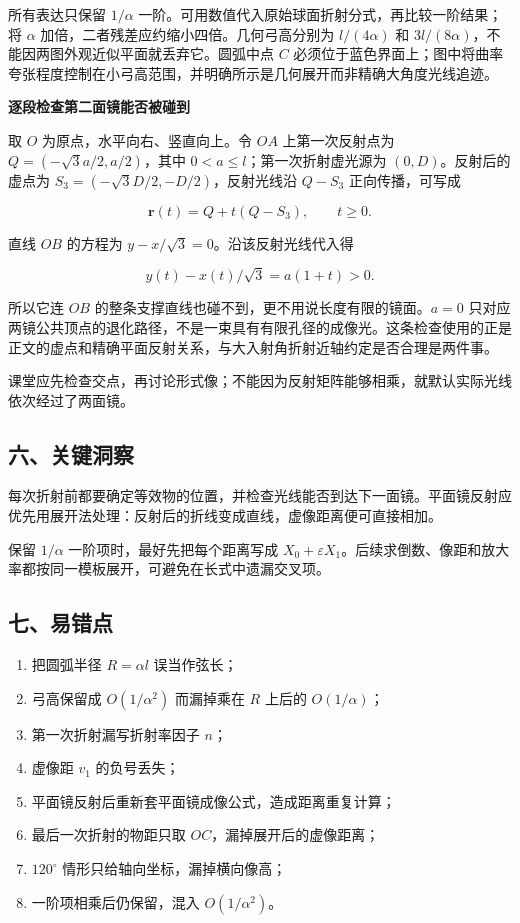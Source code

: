 \documentclass[12pt,a4paper,UTF8]{ctexart}
\newcommand{\tightlist}{\setlength{\itemsep}{0pt}\setlength{\parskip}{0pt}}
\begin{document}
所有表达只保留 \(1/\alpha\)
一阶。可用数值代入原始球面折射分式，再比较一阶结果；将 \(\alpha\)
加倍，二者残差应约缩小四倍。几何弓高分别为 \(l/(4\alpha)\) 和
\(3l/(8\alpha)\)，不能因两图外观近似平面就丢弃它。圆弧中点 \(C\)
必须位于蓝色界面上；图中将曲率夸张程度控制在小弓高范围，并明确所示是几何展开而非精确大角度光线追迹。

\textbf{逐段检查第二面镜能否被碰到}

取 \(O\) 为原点，水平向右、竖直向上。令 \(OA\) 上第一次反射点为
\(Q=(-\sqrt3 a/2,a/2)\)，其中 \(0<a\le l\)；第一次折射虚光源为
\((0,D)\)。反射后的虚点为 \(S_3=(-\sqrt3D/2,-D/2)\)，反射光线沿
\(Q-S_3\) 正向传播，可写成

\[\bm r(t)=Q+t(Q-S_3),\qquad t\ge0.\]

直线 \(OB\) 的方程为 \(y-x/\sqrt3=0\)。沿该反射光线代入得

\[y(t)-x(t)/\sqrt3=a(1+t)>0.\]

所以它连 \(OB\) 的整条支撑直线也碰不到，更不用说长度有限的镜面。\(a=0\)
只对应两镜公共顶点的退化路径，不是一束具有有限孔径的成像光。这条检查使用的正是正文的虚点和精确平面反射关系，与大入射角折射近轴约定是否合理是两件事。

课堂应先检查交点，再讨论形式像；不能因为反射矩阵能够相乘，就默认实际光线依次经过了两面镜。

\subsection{六、关键洞察}\label{ux516dux5173ux952eux6d1eux5bdf-2}

每次折射前都要确定等效物的位置，并检查光线能否到达下一面镜。平面镜反射应优先用展开法处理：反射后的折线变成直线，虚像距离便可直接相加。

保留 \(1/\alpha\) 一阶项时，最好先把每个距离写成
\(X_0+\varepsilon X_1\)。后续求倒数、像距和放大率都按同一模板展开，可避免在长式中遗漏交叉项。

\subsection{七、易错点}\label{ux4e03ux6613ux9519ux70b9-2}

\begin{enumerate}
\def\labelenumi{\arabic{enumi}.}
\tightlist
\item
  把圆弧半径 \(R=\alpha l\) 误当作弦长；
\item
  弓高保留成 \(O(1/\alpha^2)\) 而漏掉乘在 \(R\) 上后的 \(O(1/\alpha)\)；
\item
  第一次折射漏写折射率因子 \(n\)；
\item
  虚像距 \(v_1\) 的负号丢失；
\item
  平面镜反射后重新套平面镜成像公式，造成距离重复计算；
\item
  最后一次折射的物距只取 \(OC\)，漏掉展开后的虚像距离；
\item
  \(120^\circ\) 情形只给轴向坐标，漏掉横向像高；
\item
  一阶项相乘后仍保留，混入 \(O(1/\alpha^2)\)。
\end{enumerate}
\end{document}
